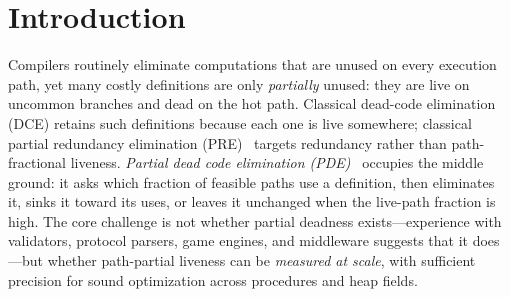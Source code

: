\documentclass[acmsmall,screen,review,anonymous]{acmart}
\begin{document}


\maketitle

\section{Introduction}
\label{sec:intro}

Compilers routinely eliminate computations that are unused on every execution path, yet many costly definitions are only \emph{partially} unused: they are live on uncommon branches and dead on the hot path. Classical dead-code elimination (DCE) retains such definitions because each one is live somewhere; classical partial redundancy elimination (PRE)~\cite{morel1979global,kennedy1999partial} targets redundancy rather than path-fractional liveness. \emph{Partial dead code elimination (PDE)}~\cite{knoop1994partial} occupies the middle ground: it asks which fraction of feasible paths use a definition, then eliminates it, sinks it toward its uses, or leaves it unchanged when the live-path fraction is high. The core challenge is not whether partial deadness exists---experience with validators, protocol parsers, game engines, and middleware suggests that it does---but whether path-partial liveness can be \emph{measured at scale}, with sufficient precision for sound optimization across procedures and heap fields.
\end{document}
